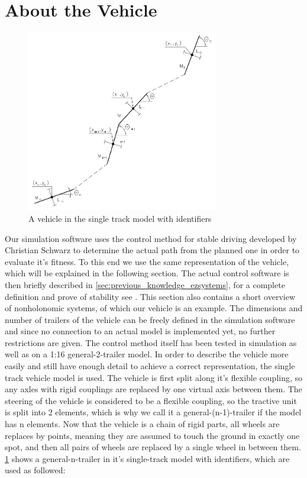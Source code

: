 \section{About the Vehicle}
\label{sec:previous_knowledge_vehicle}

\begin{figure}[t]
\centering
\includegraphics[width=0.75\textwidth]{./Chapters/Figures/single-track-model.png}
\caption{A vehicle in the single track model with identifiers\label{pic:single-track-model}}
\end{figure}

Our simulation software uses the control method for stable driving developed by Christian Schwarz to determine the actual path from the planned one in order to evaluate it's fitness. To this end we use the same representation of the vehicle, which will be explained in the following section. The actual control software is then briefly described in \ref{sec:previous_knowledge_ezsystems}, for a complete definition and prove of stability see \cite{12}. This section also contains a short overview of nonholonomic systems, of which our vehicle is an example.
The dimensions and number of trailers of the vehicle can be freely defined in the simulation software and since no connection to an actual model is implemented yet, no further restrictions are given. The control method itself has been tested in simulation as well as on a 1:16 general-2-trailer model. In order to describe the vehicle more easily and still have enough detail to achieve a correct representation, the single track vehicle model is used.\cite{27} The vehicle is first split along it's flexible coupling, so any axles with rigid couplings are replaced by one virtual axis between them. The steering of the vehicle is considered to be a flexible coupling, so the tractive unit is split into 2 elements, which is why we call it a general-(n-1)-trailer if the model has n elements. Now that the vehicle is a chain of rigid parts, all wheels are replaces by points, meaning they are assumed to touch the ground in exactly one spot, and then all pairs of wheels are replaced by a single wheel in between them. \ref{pic:single-track-model} shows a general-n-trailer in it's single-track model with identifiers, which are used as followed:

